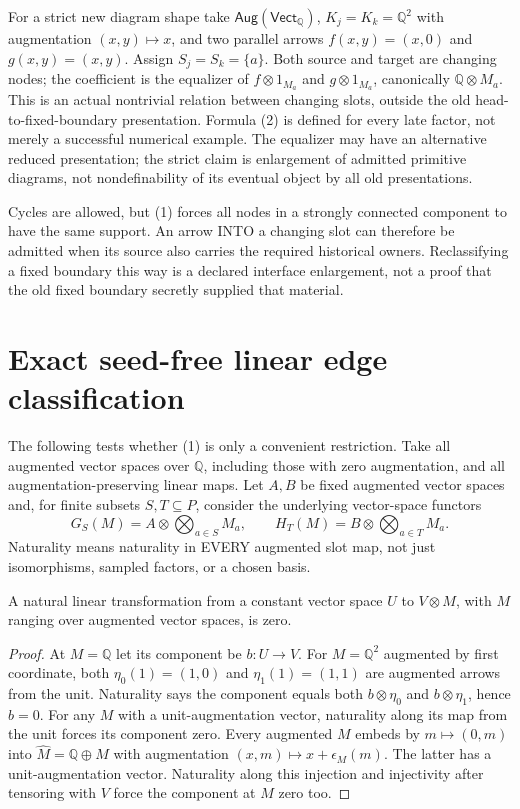 \documentclass[11pt]{article}
\newcommand{\Aug}{\mathsf{Aug}}\newcommand{\supp}{\mathop{\rm supp}}
\begin{document}
For a strict new diagram shape take $\Aug(\mathsf{Vect}_{\mathbb Q})$, $K_j=K_k=\mathbb Q^2$ with augmentation $(x,y)\mapsto x$, and two parallel arrows $f(x,y)=(x,0)$ and $g(x,y)=(x,y)$. Assign $S_j=S_k=\{a\}$. Both source and target are changing nodes; the coefficient is the equalizer of $f\otimes1_{M_a}$ and $g\otimes1_{M_a}$, canonically $\mathbb Q\otimes M_a$. This is an actual nontrivial relation between changing slots, outside the old head-to-fixed-boundary presentation. Formula (2) is defined for every late factor, not merely a successful numerical example. The equalizer may have an alternative reduced presentation; the strict claim is enlargement of admitted primitive diagrams, not nondefinability of its eventual object by all old presentations.

Cycles are allowed, but (1) forces all nodes in a strongly connected component to have the same support. An arrow INTO a changing slot can therefore be admitted when its source also carries the required historical owners. Reclassifying a fixed boundary this way is a declared interface enlargement, not a proof that the old fixed boundary secretly supplied that material.

\section{Exact seed-free linear edge classification}
The following tests whether (1) is only a convenient restriction. Take all augmented vector spaces over $\mathbb Q$, including those with zero augmentation, and all augmentation-preserving linear maps. Let $A,B$ be fixed augmented vector spaces and, for finite subsets $S,T\subseteq P$, consider the underlying vector-space functors
\[
 G_S(M)=A\otimes\bigotimes_{a\in S}M_a,\qquad
 H_T(M)=B\otimes\bigotimes_{a\in T}M_a.
\]
Naturality means naturality in EVERY augmented slot map, not just isomorphisms, sampled factors, or a chosen basis.

\begin{lemma}
A natural linear transformation from a constant vector space $U$ to $V\otimes M$, with $M$ ranging over augmented vector spaces, is zero.
\end{lemma}
\begin{proof}
At $M=\mathbb Q$ let its component be $b:U\to V$. For $M=\mathbb Q^2$ augmented by first coordinate, both $\eta_0(1)=(1,0)$ and $\eta_1(1)=(1,1)$ are augmented arrows from the unit. Naturality says the component equals both $b\otimes\eta_0$ and $b\otimes\eta_1$, hence $b=0$. For any $M$ with a unit-augmentation vector, naturality along its map from the unit forces its component zero. Every augmented $M$ embeds by $m\mapsto(0,m)$ into $\widehat M=\mathbb Q\oplus M$ with augmentation $(x,m)\mapsto x+\epsilon_M(m)$. The latter has a unit-augmentation vector. Naturality along this injection and injectivity after tensoring with $V$ force the component at $M$ zero too.
\end{proof}
\end{document}
